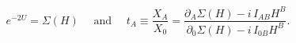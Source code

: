 \begin{equation} \label{mc1sol}
 e^{-2 U} = \Sigma(H) \quad \mbox{ and } \quad
 t_A \equiv \frac{X_A}{X_0} =
 \frac{\partial_A \Sigma(H) - i\, I_{AB} H^B}{\partial_0 \Sigma(H)- i\, I_{0B}
 H^B}.
\end{equation}

